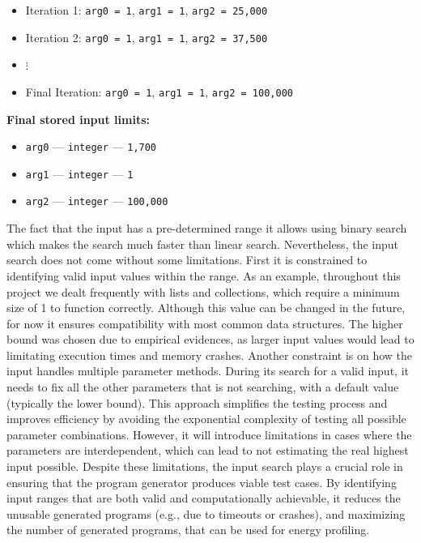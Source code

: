 \begin{tcolorbox}
\begin{itemize}
    \item Iteration 1: \texttt{arg0 = 1}, \texttt{arg1 = 1}, \texttt{arg2 = 25,000}
    \item Iteration 2: \texttt{arg0 = 1}, \texttt{arg1 = 1}, \texttt{arg2 = 37,500}
    \item $\vdots$
    \item Final Iteration: \texttt{arg0 = 1}, \texttt{arg1 = 1}, \texttt{arg2 = 100,000}
\end{itemize}

\textbf{Final stored input limits:}
\begin{itemize}
    \item \texttt{arg0} — \texttt{integer} — \texttt{1,700}
    \item \texttt{arg1} — \texttt{integer} — \texttt{1}
    \item \texttt{arg2} — \texttt{integer} — \texttt{100,000}
\end{itemize}

\end{tcolorbox}


The fact that the input has a pre-determined range it allows using binary search which makes the search much faster than linear search.
Nevertheless, the input search does not come without some limitations. First it is constrained to identifying valid input values within the range. As an example, throughout this project we dealt frequently with lists and collections, which require a minimum size of 1 to function correctly. Although this value can be changed in the future, for now it ensures compatibility with most common data structures. The higher bound was chosen due to empirical evidences, as larger input values would lead to limitating execution times and memory crashes. Another constraint is on how the input handles multiple parameter methods. During its search for a valid input, it needs to fix all the other parameters that is not searching, with a default value (typically the lower bound). This approach simplifies the testing process and improves efficiency by avoiding the exponential complexity of testing all possible parameter combinations. However, it will introduce limitations in cases where the parameters are interdependent, which can lead to not estimating the real highest input possible. 
Despite these limitations, the input search plays a crucial role in ensuring that the program generator produces viable test cases. By identifying input ranges that are both valid and computationally achievable, it reduces the unusable generated programs (e.g., due to timeouts or crashes), and maximizing the number of generated programs, that can be used for energy profiling.



